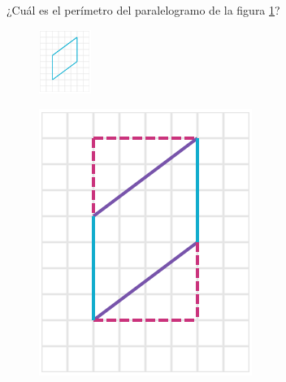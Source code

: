 
¿Cuál es el perímetro del paralelogramo de la figura \ref{fig:peri_paralelogramo_01}?
\begin{figure}[H]
    \centering
    \includegraphics[width=0.15\textwidth]{../images/peri_paralelogramo_01.png}
    \caption{}
    \label{fig:peri_paralelogramo_01}
\end{figure}
\begin{solutionbox}{16cm}
    \begin{minipage}{0.4\textwidth}
        \begin{multicols}{2}
            \begin{figure}[H]
                \centering
                \includegraphics[width=0.9\linewidth]{../images/peri_paralelogramo_01a.png}

\end{figure}
\end{multicols}
\end{minipage}
\end{solutionbox}
